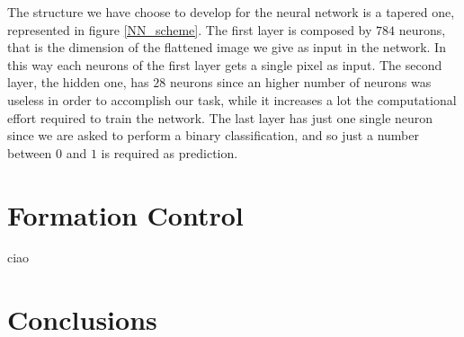 \documentclass[a4paper,11pt,oneside]{book}
\begin{document}



The structure we have choose to develop for the neural network is a tapered one, represented in figure \ref{NN_scheme}. 
The first layer is composed by $784$ neurons, that is the dimension of the flattened image we give as input in the network. In this way each neurons of the first layer gets a single pixel as input. The second layer, the hidden one, has $28$ neurons since an higher number of neurons was useless in order to accomplish our task, while it increases a lot the computational effort required to train the network. The last layer has just one single neuron since we are asked to perform a binary classification, and so just a number between $0$ and $1$ is required as prediction.







\chapter{Formation Control}
ciao
  

\chapter*{Conclusions}

{}



\end{document}
